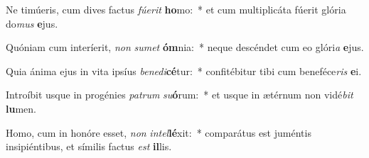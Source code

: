 \item Ne timúeris, cum dives factus \textit{fú}\textit{e}\textit{rit} \textbf{ho}mo:~* et cum multiplicáta fúerit glória do\textit{mus} \textbf{e}jus.
\item Quóniam cum interíerit, \textit{non} \textit{su}\textit{met} \textbf{óm}nia:~* neque descéndet cum eo glóri\textit{a} \textbf{e}jus.
\item Quia ánima ejus in vita ipsíus \textit{be}\textit{ne}\textit{di}\textbf{cé}tur:~* confitébitur tibi cum beneféce\textit{ris} \textbf{e}i.
\item Introíbit usque in progénies \textit{pa}\textit{trum} \textit{su}\textbf{ó}rum:~* et usque in ætérnum non vidé\textit{bit} \textbf{lu}men.
\item Homo, cum in honóre esset, \textit{non} \textit{in}\textit{tel}\textbf{lé}xit:~* comparátus est juméntis insipiéntibus, et símilis factus \textit{est} \textbf{il}lis.
